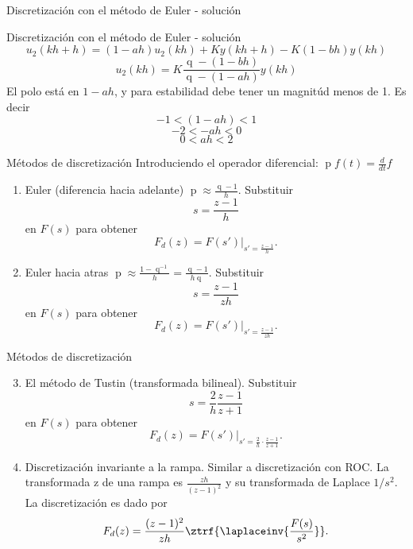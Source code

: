 \documentclass[presentation,aspectratio=1610]{beamer}
\DeclareMathOperator{\shift}{q}
\DeclareMathOperator{\diff}{p}
\begin{document}
\begin{frame}[label={sec:org2634602}]{Discretización con el método de Euler - solución}
\end{frame}

\begin{frame}[label={sec:orga8384d6}]{Discretización con el método de Euler - solución}
\[ u_2(kh+h) = (1-ah)u_2(kh) + Ky(kh+h) - K(1-bh)y(kh) \]
\[ u_2(kh) = K \frac{\shift - (1-bh)}{\shift - (1-ah)} y(kh)\]
El polo está en \(1-ah\), y para estabilidad debe tener un magnitúd menos de 1. Es decir 
\[ -1 < (1-ah) < 1\]
\[ -2 < -ah < 0 \]
\[ 0 < ah < 2\]
\begin{center}
\end{center}
\end{frame}


\begin{frame}[label={sec:org0eb00f5}]{Métodos de discretización}
Introduciendo el operador diferencial:  \(\diff f(t) = \frac{d}{dt} f\)

\begin{enumerate}
\item Euler (diferencia hacia adelante) \(\diff \approx \frac{\shift -1}{h}\). Substituir
\[ s = \frac{z-1}{h} \] en \(F(s)\) para obtener
\[ F_d(z) = F(s')|_{s'=\frac{z-1}{h}}. \]
\item Euler hacia atras \(\diff \approx \frac{1 - \shift^{-1}}{h} = \frac{\shift -1}{h\shift}\). Substituir
\[ s = \frac{z-1}{zh} \] en \(F(s)\) para obtener
\[ F_d(z) = F(s')|_{s'=\frac{z-1}{zh}}. \]
\end{enumerate}
\end{frame}

\begin{frame}[label={sec:org3345a0e}]{Métodos de discretización}
\begin{enumerate}
\setcounter{enumi}{2}
\item El método de Tustin (transformada bilineal). Substituir
\[ s = \frac{2}{h}\frac{z-1}{z+1} \] en \(F(s)\) para obtener
\[ F_d(z) = F(s')|_{s'=\frac{2}{h}\cdot \frac{z-1}{z+1}}. \]
\item Discretización invariante a la rampa. Similar a discretización con ROC. La transformada z de una rampa es  \(\frac{zh}{(z-1)^2}\) y su transformada de Laplace \(1/s^2\). La discretización es dado por
\[ F_d(z) = \frac{(z-1)^2}{zh} \ztrf{\laplaceinv{\frac{F(s)}{s^2}}}. \]
\end{enumerate}
\end{frame}
\end{document}
